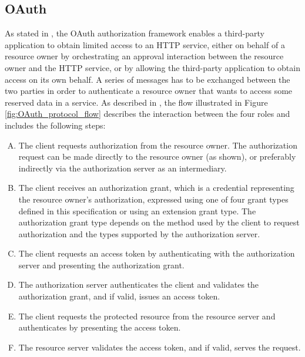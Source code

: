 \subsection{OAuth}
As stated in \cite{ietf_oauth2}, the \gls{OAuth} authorization framework enables a third-party application to obtain limited access to an HTTP service, either on behalf of a resource owner by orchestrating an approval interaction between the resource owner and the HTTP service, or by allowing the third-party application to obtain access on its own behalf.
A series of messages has to be exchanged between the two parties in order to authenticate a resource owner that wants to access some reserved data in a service. As described in \cite{ietf_oauth2}, the flow illustrated in Figure \ref{fig:OAuth_protocol_flow} describes the interaction between the four roles and includes the following steps:
\begin{enumerate}[(A)]
    \item The client requests authorization from the resource owner.  The authorization request can be made directly to the resource owner (as shown), or preferably indirectly via the authorization server as an intermediary.
    \item The client receives an authorization grant, which is a credential representing the resource owner's authorization, expressed using one of four grant types defined in this specification or using an extension grant type. The authorization grant type depends on the method used by the client to request authorization and the types supported by the authorization server.
    \item The client requests an access token by authenticating with the authorization server and presenting the authorization grant.
    \item The authorization server authenticates the client and validates the authorization grant, and if valid, issues an access token.
    \item The client requests the protected resource from the resource server and authenticates by presenting the access token.
    \item The resource server validates the access token, and if valid, serves the request.
\end{enumerate}
 
